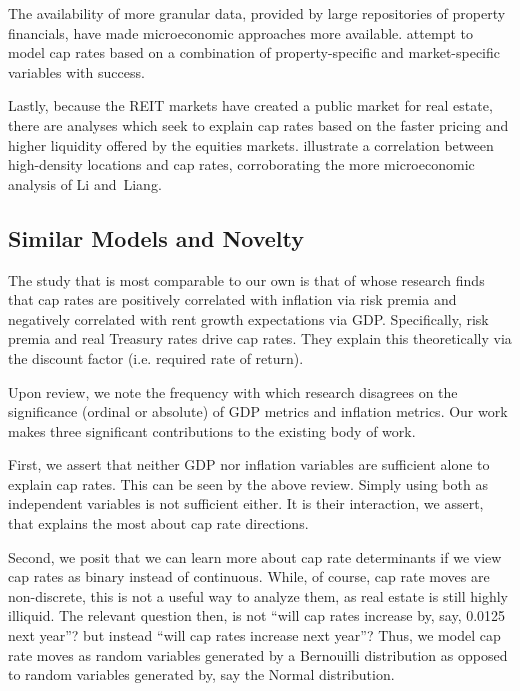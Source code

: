 \documentclass[jrfm,article,accept,oneauthor,pdftex]{Definitions/mdpi}
\begin{document}
The availability of more granular data, provided by large repositories of property financials, have made microeconomic approaches more available. \cite{li2020beyond} attempt to model cap rates based on a combination of property-specific and market-specific variables with success. 

Lastly, because the REIT markets have created a public market for real estate, there are analyses which seek to explain cap rates based on the faster pricing and higher liquidity offered by the equities markets. \cite{fisher2022location} illustrate a correlation between high-density locations and cap rates, corroborating the more microeconomic analysis of Li and~Liang.


\subsection{Similar Models and Novelty}

The study that is most comparable to our own is that of \cite{duca2017taxes} whose research finds that cap rates are positively correlated with inflation via risk premia and negatively correlated with rent growth expectations via GDP. Specifically, risk premia and real Treasury rates drive cap rates. They explain this theoretically via the discount factor (i.e. required rate of return).

Upon review, we note the frequency with which research disagrees on the significance (ordinal or absolute) of GDP metrics and inflation metrics. Our work makes three significant contributions to the existing body of work. 

First, we assert that neither GDP nor inflation variables are sufficient alone to explain cap rates. This can be seen by the above review. Simply using both as independent variables is not sufficient either. It is their interaction, we assert, that explains the most about cap rate directions. 

Second, we posit that we can learn more about cap rate determinants if we view cap rates as binary instead of continuous. While, of course, cap rate moves are non-discrete, this is not a useful way to analyze them, as real estate is still highly illiquid. The relevant question then, is not “will cap rates increase by, say,  0.0125 next year”? but instead “will cap rates increase next year”? Thus, we model cap rate moves as random variables generated by a Bernouilli distribution as opposed to random variables generated by, say the Normal distribution. 
\end{document}

